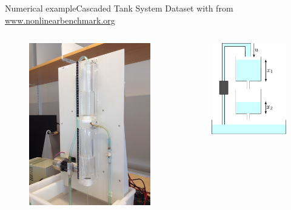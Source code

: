 \documentclass{beamer}
\begin{document}
\begin{frame}{Numerical example}{Cascaded Tank System}
Dataset with  from \url{www.nonlinearbenchmark.org}
\begin{columns}
\begin{figure}
\centering
\includegraphics[width=.38\linewidth]{img/CTS/CTS.jpg}
\end{figure}
\begin{figure}
\centering
\includegraphics[width=.6\linewidth]{img/CTS/CTS_scheme.pdf}

\end{figure}
\end{columns}
\end{frame}
\end{document}
